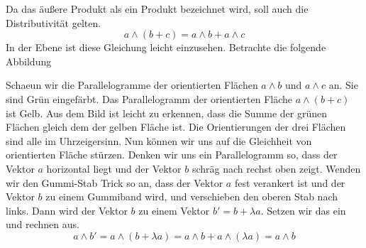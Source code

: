 \documentclass[fleqn]{scrartcl}
\numberwithin{equation}{section}
\begin{document}
Da das äußere Produkt als ein Produkt bezeichnet wird, soll auch die
Distributivität gelten.
\[a\wedge (b + c) = a\wedge b + a\wedge c\]
In der Ebene ist diese Gleichung leicht einzusehen. Betrachte die folgende
Abbildung
\begin{center}
\begin{minipage}{\linewidth}
\centering
{}
\label{fig:distributivity}
\end{minipage}
\end{center}
Schaeun wir die Parallelogramme der orientierten Flächen $a\wedge b$ und
$a\wedge c$ an. Sie sind Grün eingefärbt. Das Parallelogramm der orientierten
Fläche $a\wedge (b + c)$ ist Gelb. Aus dem Bild ist leicht zu erkennen, dass
die Summe der grünen Flächen gleich dem der gelben Fläche ist. Die
Orientierungen der drei Flächen sind alle im Uhrzeigersinn.
\newpage
Nun können wir uns auf die Gleichheit von orientierten Fläche stürzen. Denken
wir uns ein Parallelogramm so, dass der Vektor $a$ horizontal liegt und der
Vektor $b$ schräg nach rechst oben zeigt. Wenden wir den Gummi-Stab Trick so
an, dass der Vektor $a$ fest verankert ist und der Vektor $b$ zu einem
Gummiband wird, und verschieben den oberen Stab nach links. Dann wird der
Vektor $b$ zu einem Vektor $b'=b+\lambda a$. Setzen wir das ein und rechnen
aus.
\[a\wedge b' = a\wedge (b + \lambda a) = a \wedge b + a\wedge (\lambda a)=
a\wedge b\]
\end{document}
